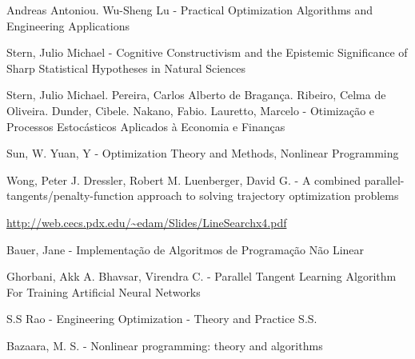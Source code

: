 \documentclass[12pt]{article}
\begin{document}
\newpage
\begin{thebibliography}{3}

Andreas Antoniou. Wu-Sheng Lu - Practical Optimization  Algorithms and Engineering Applications

Stern, Julio Michael - Cognitive Constructivism and the Epistemic Significance of Sharp Statistical Hypotheses in Natural Sciences

Stern, Julio Michael. Pereira, Carlos Alberto de Bragança. Ribeiro, Celma de Oliveira. Dunder, Cibele. Nakano, Fabio. Lauretto, Marcelo - Otimização e Processos Estocásticos Aplicados à Economia e Finanças

Sun, W. Yuan, Y - Optimization Theory and Methods, Nonlinear Programming

Wong, Peter J. Dressler, Robert M. Luenberger, David G. - A combined parallel-tangents/penalty-function approach to solving trajectory optimization problems

\url{http://web.cecs.pdx.edu/~edam/Slides/LineSearchx4.pdf}

Bauer, Jane - Implementação de Algoritmos de Programação Não Linear

Ghorbani, Akk A. Bhavsar, Virendra C. - Parallel Tangent Learning Algorithm For Training Artificial Neural Networks

S.S Rao - Engineering Optimization - Theory and Practice S.S.

Bazaara, M. S. - Nonlinear programming: theory and algorithms

\end{thebibliography}
\end{document}
